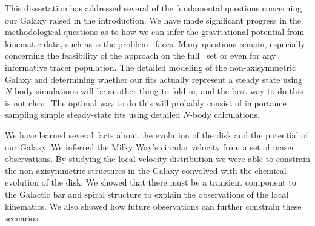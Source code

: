 This dissertation has addressed several of the fundamental questions
concerning our Galaxy raised in the introduction. We have made
significant progress in the methodological questions as to how we can
infer the gravitational potential from kinematic data, such as is the
problem \Gaia\ faces. Many questions remain, especially concerning the
feasibility of the approach on the full \Gaia\ set or even for any
informative tracer population. The detailed modeling of the
non-axisymmetric Galaxy and determining whether our fits actually
represent a steady state using $N$-body simulations will be another
thing to fold in, and the best way to do this is not clear. The
optimal way to do this will probably consist of importance sampling
simple steady-state fits using detailed $N$-body calculations.

We have learned several facts about the evolution of the disk and the
potential of our Galaxy. We inferred the Milky Way's circular velocity
from a set of maser observations. By studying the local velocity
distribution we were able to constrain the non-axisymmetric structures
in the Galaxy convolved with the chemical evolution of the disk. We
showed that there must be a transient component to the Galactic bar
and spiral structure to explain the observations of the local
kinematics. We also showed how future observations can further
constrain these scenarios.

